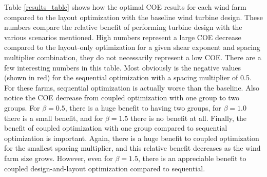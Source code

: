 \documentclass[wes, manuscript]{copernicus}
\begin{document}
Table \ref{results_table} shows how the optimal COE results for each wind farm compared to the layout optimization with the baseline wind turbine design. These numbers compare the relative benefit of performing turbine design with the various scenarios mentioned. High numbers represent a large COE decrease compared to the layout-only optimization for a given shear exponent and spacing multiplier combination, they do not necessarily represent a low COE.
There are a few interesting numbers in this table. Most obviously is the negative values (shown in red) for the sequential optimization with a spacing multiplier of 0.5. For these farms, sequential optimization is actually worse than the baseline. Also notice the COE decrease from coupled optimization with one group to two groups. For $\beta=0.5$, there is a huge benefit to having two groups, for $\beta=1.0$ there is a small benefit, and for $\beta=1.5$ there is no benefit at all. Finally, the benefit of coupled optimization with one group compared to sequential optimization is important. Again, there is a huge benefit to coupled optimization for the smallest spacing multiplier, and this relative benefit decreases as the wind farm size grows. However, even for $\beta=1.5$, there is an appreciable benefit to coupled design-and-layout optimization compared to sequential.
\end{document}
